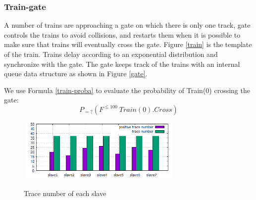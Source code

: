 \subsubsection{Train-gate}
A number of trains are approaching a gate on which there is only one track, gate controls the trains to avoid collisions, and restarts them when it is possible to make sure that trains will eventually cross the gate. Figure \ref{train} is the template of the train. Trains delay according to an exponential distribution and synchronize with the gate. The gate keeps track of the trains with an internal queue data structure as shown in Figure \ref{gate}.
\begin{figure}[htbp]
\end{figure}
We use Formula \ref{train-proba} to evaluate the probability of Train(0) crossing the gate:
\begin{equation}
P_{=?}(F^{\leq100}~Train(0).Cross)
\label{train-proba}
\end{equation}
\begin{figure}[htbp]
	\centering
	{\includegraphics[width=3.2in,height=1.2in]{fig/trace-slave.png}}
	\caption{Trace number of each slave}
   \label{trace-slave}
\end{figure}
